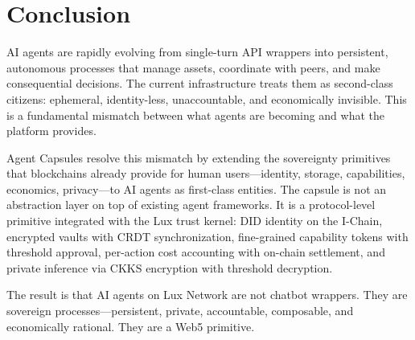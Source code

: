 \section{Conclusion}
\label{sec:conclusion}

AI agents are rapidly evolving from single-turn API wrappers into persistent, autonomous processes that manage assets, coordinate with peers, and make consequential decisions. The current infrastructure treats them as second-class citizens: ephemeral, identity-less, unaccountable, and economically invisible. This is a fundamental mismatch between what agents are becoming and what the platform provides.

Agent Capsules resolve this mismatch by extending the sovereignty primitives that blockchains already provide for human users---identity, storage, capabilities, economics, privacy---to AI agents as first-class entities. The capsule is not an abstraction layer on top of existing agent frameworks. It is a protocol-level primitive integrated with the Lux trust kernel: DID identity on the I-Chain, encrypted vaults with CRDT synchronization, fine-grained capability tokens with threshold approval, per-action cost accounting with on-chain settlement, and private inference via CKKS encryption with threshold decryption.

The result is that AI agents on Lux Network are not chatbot wrappers. They are sovereign processes---persistent, private, accountable, composable, and economically rational. They are a Web5 primitive.


